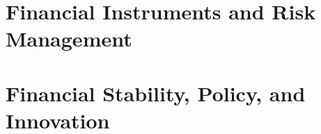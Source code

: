 \documentclass[12pt,a4paper]{book}
\begin{document}
\part{Financial Instruments and Risk Management}





\part{Financial Stability, Policy, and Innovation}





\backmatter

\end{document}
